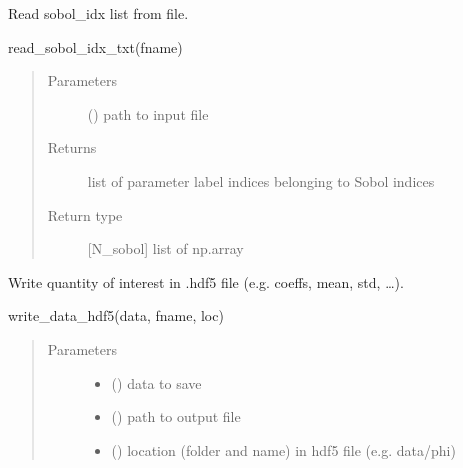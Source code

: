 \documentclass[letterpaper,10pt,english,openany,oneside]{sphinxmanual}
\begin{document}
\begin{fulllineitems}
\label{\detokenize{pygpc:pygpc.rw.read_sobol_idx_txt}}
Read sobol\_idx list from file.

read\_sobol\_idx\_txt(fname)
\begin{quote}\begin{description}
\item[{Parameters}] \leavevmode
{} () \textendash{} path to input file

\item[{Returns}] \leavevmode
{} \textendash{} list of parameter label indices belonging to Sobol indices

\item[{Return type}] \leavevmode
{[}N\_sobol{]} list of np.array

\end{description}\end{quote}

\end{fulllineitems}


\begin{fulllineitems}
\label{\detokenize{pygpc:pygpc.rw.write_data_hdf5}}
Write quantity of interest in .hdf5 file (e.g. coeffs, mean, std, …).

write\_data\_hdf5(data, fname, loc)
\begin{quote}\begin{description}
\item[{Parameters}] \leavevmode\begin{itemize}
\item {} 
 () \textendash{} data to save

\item {} 
 () \textendash{} path to output file

\item {} 
 () \textendash{} location (folder and name) in hdf5 file (e.g. data/phi)

\end{itemize}

\end{description}\end{quote}

\end{fulllineitems}
\end{document}
